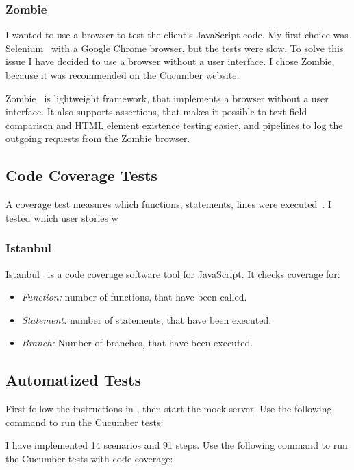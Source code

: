 \subsubsection{Zombie}
I wanted to use a browser to test the client's JavaScript code. My first choice was Selenium~\cite{selenium} with a Google Chrome browser, but the tests were slow. To solve this issue I have decided to use a browser without a user interface. I chose Zombie, because it was recommended on the Cucumber website.

Zombie~\cite{zombie} is lightweight framework, that implements a browser without a user interface. It also supports assertions, that makes it possible to text field comparison and HTML element existence testing easier, and pipelines to log the outgoing requests from the Zombie browser. 

\subsection{Code Coverage Tests}
A coverage test measures which functions, statements, lines were executed~\cite{szofttech}. I tested which user stories w

\subsubsection{Istanbul}
Istanbul~\cite{istanbul} is a code coverage software tool for JavaScript. It checks coverage for:

\begin{itemize}
	\item \emph{Function:} number of functions, that have been called.
	\item \emph{Statement:} number of statements, that have been executed.
	\item \emph{Branch:} Number of branches, that have been executed.
\end{itemize}

\subsection{Automatized Tests}
First follow the instructions in , then start the mock server. Use the following command to run the Cucumber tests:


I have implemented 14 scenarios and 91 steps. Use the following command to run the Cucumber tests with code coverage:

